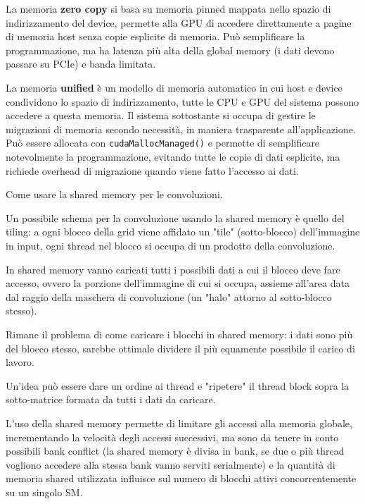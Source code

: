 \begin{questions}
\begin{solution}
        La memoria \textbf{zero copy} si basa su memoria pinned mappata nello spazio di indirizzamento del device, permette alla GPU di accedere direttamente a pagine di memoria host senza copie esplicite di memoria. Può semplificare la programmazione, ma ha latenza più alta della global memory (i dati devono passare su PCIe) e banda limitata.
        
        La memoria \textbf{unified} è un modello di memoria automatico in cui host e device condividono lo spazio di indirizzamento, tutte le CPU e GPU del sistema possono accedere a questa memoria. Il sistema sottostante si occupa di gestire le migrazioni di memoria secondo necessità, in maniera trasparente all'applicazione. Può essere allocata con \texttt{cudaMallocManaged()} e permette di semplificare notevolmente la programmazione, evitando tutte le copie di dati esplicite, ma richiede overhead di migrazione quando viene fatto l'accesso ai dati.
    \end{solution}
    
    \question Come usare la shared memory per le convoluzioni.
    
    \begin{solution}
        Un possibile schema per la convoluzione usando la shared memory è quello del tiling: a ogni blocco della grid viene affidato un "tile" (sotto-blocco) dell'immagine in input, ogni thread nel blocco si occupa di un prodotto della convoluzione. 
        
        In shared memory vanno caricati tutti i possibili dati a cui il blocco deve fare accesso, ovvero la porzione dell'immagine di cui si occupa, assieme all'area data dal raggio della maschera di convoluzione (un "halo" attorno al sotto-blocco stesso).
        
        Rimane il problema di come caricare i blocchi in shared memory: i dati sono più del blocco stesso, sarebbe ottimale dividere il più equamente possibile il carico di lavoro. 
        
        Un'idea può essere dare un ordine ai thread e "ripetere" il thread block sopra la sotto-matrice formata da tutti i dati da caricare.
        
        L'uso della shared memory permette di limitare gli accessi alla memoria globale, incrementando la velocità degli accessi successivi, ma sono da tenere in conto possibili bank conflict (la shared memory è divisa in bank, se due o più thread vogliono accedere alla stessa bank vanno serviti serialmente) e la quantità di memoria shared utilizzata influisce sul numero di blocchi attivi concorrentemente su un singolo SM.
    \end{solution}
    

\end{questions}
